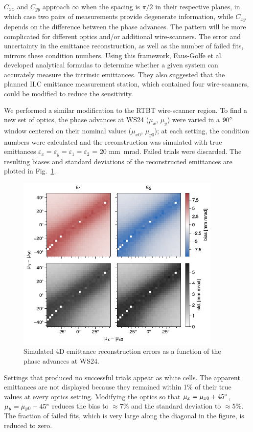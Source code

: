 %
$C_{xx}$ and $C_{yy}$ approach $\infty$ when the spacing is $\pi/2$ in their respective planes, in which case two pairs of measurements provide degenerate information, while $C_{xy}$ depends on the difference between the phase advances. The pattern will be more complicated for different optics and/or additional wire-scanners. The error and uncertainty in the emittance reconstruction, as well as the number of failed fits, mirrors these condition numbers. Using this framework, Faus-Golfe et al. developed analytical formulas to determine whether a given system can accurately measure the intrinsic emittances. They also suggested that the planned ILC emittance measurement station, which contained four wire-scanners, could be modified to reduce the sensitivity. 

We performed a similar modification to the RTBT wire-scanner region. To find a new set of optics, the phase advances at WS24 ($\mu_x$, $\mu_y$) were varied in a $90\degree$ window centered on their nominal values ($\mu_{x0}$, $\mu_{y0}$); at each setting, the condition numbers were calculated and the reconstruction was simulated with true emittances $\varepsilon_x  = \varepsilon_y = \varepsilon_1 = \varepsilon_2$ = 20 mm~mrad. Failed trials were discarded. The resulting biases and standard deviations of the reconstructed emittances are plotted in Fig.~\ref{fig:rtbt_montecarlo_emittances}.
%
\begin{figure}[!p]
    \centering
    \includegraphics[width=0.9\textwidth]{Images/chapter4/rtbt_montecarlo_emittances.pdf}
    \caption{Simulated 4D emittance reconstruction errors as a function of the phase advances at WS24.}
    \label{fig:rtbt_montecarlo_emittances}
\end{figure}
%
Settings that produced no successful trials appear as white cells. The apparent emittances are not displayed because they remained within 1\% of their true values at every optics setting. Modifying the optics so that $\mu_x = \mu_{x0} + 45\degree$, $\mu_y = \mu_{y0} - 45\degree$ reduces the bias to $\approx 7\%$ and the standard deviation to $\approx 5\%$. The fraction of failed fits, which is very large along the diagonal in the figure, is reduced to zero.

